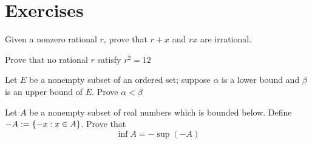 \documentclass{report}
\begin{document}
\section{Exercises}
\begin{question}{}{}
Given a nonzero rational $r$, prove that $r+x$ and $rx$ are irrational. 
\end{question}
\begin{question}{}{}
Prove that no rational $r$ satisfy  $r^2=12$
\end{question}
\begin{question}{}{}
Let $E$ be a nonempty subset of an ordered set; suppose $\alpha$ is a lower bound and $\beta$ is an upper bound of $E$. Prove $\alpha<\beta$ 
\end{question}
\begin{question}{}{}
Let $A$ be a nonempty subset of real numbers which is bounded below.  Define $-A:=\{ -x: x\in A \}$. Prove that
\begin{equation}
\inf A=-\sup (-A)
\end{equation}
\end{question}
\end{document}
